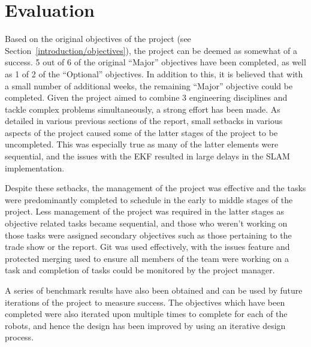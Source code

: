 
\chapter{Evaluation}\label{eval}
Based on the original objectives of the project (see Section~\ref{introduction/objectives}), the project can be deemed as somewhat of a success. 5 out of 6 of
the original ``Major'' objectives have been completed, as well as 1 of 2 of
the ``Optional'' objectives. In addition to this, it is believed that with a
small number of additional weeks, the remaining ``Major'' objective could
be completed. Given the project aimed to combine 3 engineering
disciplines and tackle complex problems simultaneously, a strong
effort has been made.
As detailed in various previous sections of the report, small setbacks in
various aspects of the project caused some of the latter stages of the project to be
uncompleted. This was especially true as many of the latter elements were sequential,
and the issues with the EKF resulted in large delays in the SLAM implementation.

Despite these setbacks, the management of the project was effective and the tasks were predominantly completed to schedule in the early to middle
stages of the project. Less management of the project was required in the latter
stages as objective related tasks became sequential, and those who weren't
working on those tasks were assigned secondary objectives such as those
pertaining to the trade show or the report. Git was used effectively, with the
issues feature and protected merging used to ensure all members of the team were
working on a task and completion of tasks could be monitored by the project
manager.

A series of benchmark results have also been obtained and can be used by future
iterations of the project to measure success. The
objectives which have been completed were also iterated upon multiple times to
complete for each of the robots, and hence the design has
been improved by using an iterative design process.

